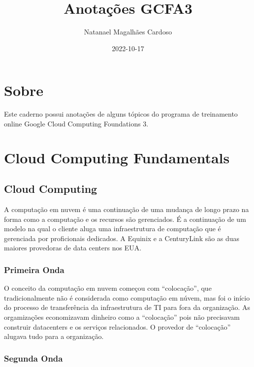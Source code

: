 \documentclass[
]{book}
\title{Anotações GCFA3}
\author{Natanael Magalhães Cardoso}
\date{2022-10-17}
\begin{document}
\maketitle

{
\setcounter{tocdepth}{1}
\tableofcontents
}
\hypertarget{sobre}{%
\chapter{Sobre}\label{sobre}}

Este caderno possui anotações de alguns tópicos do programa de
treinamento online Google Cloud Computing Foundations 3.

\hypertarget{cloud-computing-fundamentals}{%
\chapter{Cloud Computing Fundamentals}\label{cloud-computing-fundamentals}}

\hypertarget{cloud-computing}{%
\section{Cloud Computing}\label{cloud-computing}}

A computação em nuvem é uma continuação de uma mudança de longo prazo na
forma como a computação e os recursos são gerenciados. É a continuação de um
modelo na qual o cliente aluga uma infraestrutura de computação que é gerenciada
por proficionais dedicados. A Equinix e a CenturyLink são as duas maiores
provedoras de data centers nos EUA.

\hypertarget{primeira-onda}{%
\subsection{Primeira Onda}\label{primeira-onda}}

O conceito da computação em nuvem começou com ``colocação'', que tradicionalmente
não é considerada como computação em núvem, mas foi o início do processo de
transferência da infraestrutura de TI para fora da organização. As orgamizações
economizavam dinheiro como a ``colocação'' pois não precisavam construir datacenters
e os serviços relacionados. O provedor de ``colocação'' alugava tudo para a organização.

\hypertarget{segunda-onda}{%
\subsection{Segunda Onda}\label{segunda-onda}}
\end{document}
